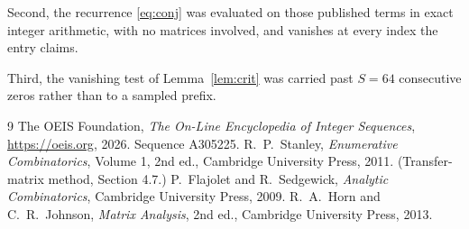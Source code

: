 \documentclass[11pt,a4paper]{article}
\theoremstyle{plain}
\theoremstyle{definition}
\begin{document}
Second, the recurrence \eqref{eq:conj} was evaluated on those published terms in exact
integer arithmetic, with no matrices involved, and vanishes at every index the entry claims.

Third, the vanishing test of Lemma~\ref{lem:crit} was carried past $S=64$ consecutive
zeros rather than to a sampled prefix.

\begin{thebibliography}{9}
 The OEIS Foundation, \emph{The On-Line Encyclopedia of Integer
Sequences}, \url{https://oeis.org}, 2026. Sequence A305225.
 R.~P.~Stanley, \emph{Enumerative Combinatorics}, Volume 1, 2nd ed.,
Cambridge University Press, 2011. (Transfer-matrix method, Section 4.7.)
 P.~Flajolet and R.~Sedgewick, \emph{Analytic Combinatorics}, Cambridge
University Press, 2009.
 R.~A.~Horn and C.~R.~Johnson, \emph{Matrix Analysis}, 2nd ed., Cambridge
University Press, 2013.
\end{thebibliography}
\end{document}
